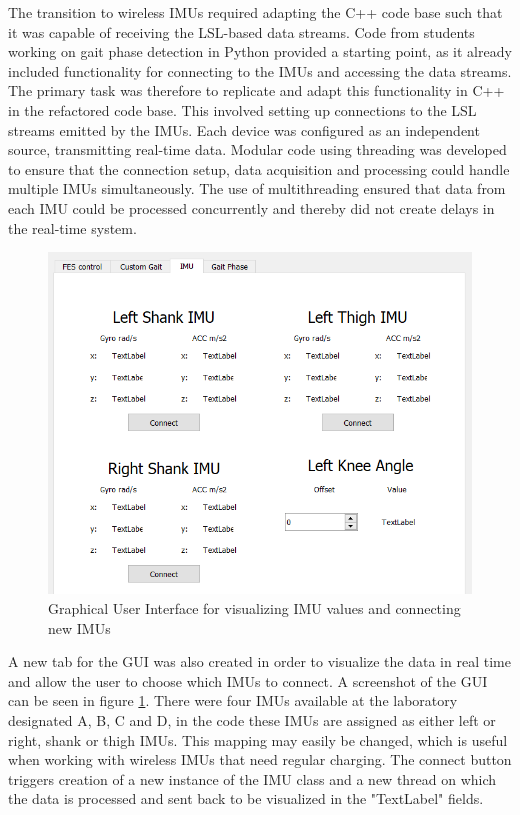 The transition to wireless IMUs required adapting the C++ code base such that it was capable of receiving the LSL-based data streams. Code from students working on gait phase detection in Python provided a starting point, as it already included functionality for connecting to the IMUs and accessing the data streams. The primary task was therefore to replicate and adapt this functionality in C++ in the refactored code base. This involved setting up connections to the LSL streams emitted by the IMUs. Each device was configured as an independent source, transmitting real-time data. Modular code using threading was developed to ensure that the connection setup, data acquisition and processing could handle multiple IMUs simultaneously. The use of multithreading ensured that data from each IMU could be processed concurrently and thereby did not create delays in the real-time system. 

\begin{figure} [h]
    \centering
    \includegraphics[width=0.7\linewidth]{images/imugui1.png}
    \caption{Graphical User Interface for visualizing IMU values and connecting new IMUs}
    \label{fig:imugui}
\end{figure}

A new tab for the GUI was also created in order to visualize the data in real time and allow the user to choose which IMUs to connect. A screenshot of the GUI can be seen in figure \ref{fig:imugui}. There were four IMUs available at the laboratory designated A, B, C and D, in the code these IMUs are assigned as either left or right, shank or thigh IMUs. This mapping may easily be changed, which is useful when working with wireless IMUs that need regular charging. The connect button triggers creation of a new instance of the IMU class and a new thread on which the data is processed and sent back to be visualized in the "TextLabel" fields.

